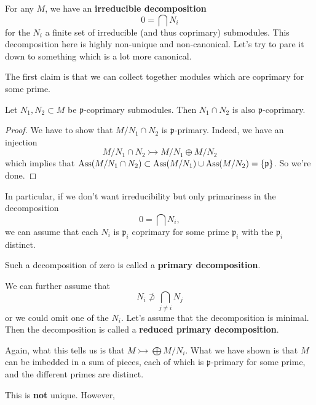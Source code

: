 For any $M$, we have an \textbf{irreducible decomposition}
\[ 0 = \bigcap N_i  \]
for the $N_i$ a finite set of irreducible (and thus coprimary) submodules. 
This decomposition here is highly non-unique and non-canonical. Let's try to
pare it down to something which is a lot more canonical.

The first claim is that we can collect together modules which are coprimary for
some prime. 
\begin{lemma} 
Let $N_1, N_2 \subset M$ be $\mathfrak{p}$-coprimary submodules. Then $N_1 \cap
N_2$ is also $\mathfrak{p}$-coprimary.
\end{lemma} 
\begin{proof} 
We have to show that $M/N_1 \cap N_2$ is $\mathfrak{p}$-primary. Indeed, we have an injection
\[ M/N_1 \cap N_2 \rightarrowtail  M/N_1 \oplus M/N_2  \]
which implies that $\mathrm{Ass}(M/N_1 \cap N_2) \subset \mathrm{Ass}(M/N_1) \cup \mathrm{Ass}(M/N_2) =
\left\{\mathfrak{p}\right\}$. So we're done. 
\end{proof} 

In particular, if we don't want irreducibility but only primariness in the
decomposition
\[ 0 = \bigcap N_i,  \]
we can assume that each $N_i$ is $\mathfrak{p}_i$ coprimary for some prime
$\mathfrak{p}_i$ with the $\mathfrak{p}_i$ distinct.

\begin{definition} 
Such a decomposition of zero is called a \textbf{primary decomposition}.
\end{definition} 

We can further assume that 
\[ N_i \not\supset \bigcap_{j \neq i} N_j  \]
or we could omit one of the $N_i$. Let's assume that the decomposition is
minimal.
Then the decomposition is called a \textbf{reduced primary decomposition}.

Again, what this tells us is that $M \rightarrowtail  \bigoplus M/N_i$. What we
have shown is that $M$ can be imbedded in a sum of pieces, each of which is
$\mathfrak{p}$-primary for some prime, and the different primes are distinct.

This is \textbf{not} unique. However, 

